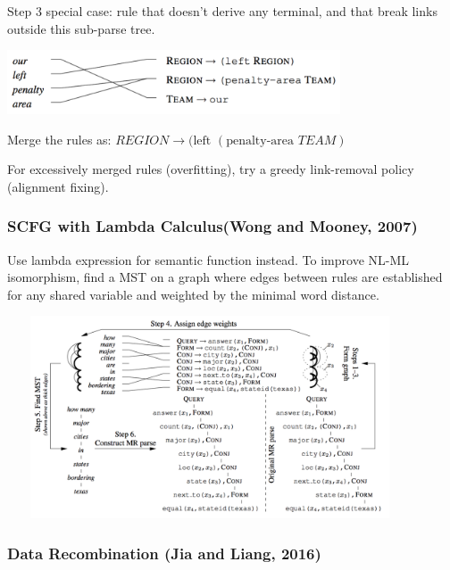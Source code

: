 \documentclass{beamer}
\begin{document}
\begin{frame}
     {
        Step 3 special case: rule that doesn't derive any terminal, and that break links
        outside this sub-parse tree.
        \begin{center}
            \includegraphics[width=9.86cm,height=1.9cm]{img/phrasal-coherence.png}
        \end{center}

        Merge the rules as: $REGION \to (\text{left } (\text{penalty-area } TEAM)$

        For excessively merged rules (overfitting), try a greedy link-removal policy
        (alignment fixing).
    }
\end{frame}

\begin{frame}
    \frametitle{SCFG with Lambda Calculus(Wong and Mooney, 2007)}
    Use lambda expression for semantic function instead. To improve NL-ML isomorphism,
    find a MST on a graph where edges between rules are established for any shared variable and 
    weighted by the minimal word distance.
    \begin{center}
        \includegraphics[width=12cm,height=6cm]{img/nl-ml-isomorphism.png}
    \end{center}
\end{frame}

\begin{frame}
    \frametitle{Data Recombination (Jia and Liang, 2016)}
\end{frame}
\end{document}
